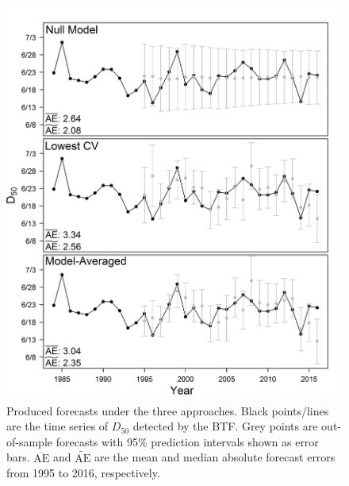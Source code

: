 \documentclass[12pt,]{book}
\theoremstyle{definition}
\theoremstyle{definition}
\theoremstyle{definition}
\theoremstyle{remark}
\begin{document}
\begin{figure}
  \centering
  \includegraphics{img/Ch2/forecasts.png}
  \caption{Produced forecasts under the three approaches. Black points/lines are the time series of $D_{50}$ detected by the BTF. Grey points are out-of-sample forecasts with 95$\%$ prediction intervals shown as error bars. $\overline{\text{AE}}$ and $\widetilde{\text{AE}}$ are the mean and median absolute forecast errors from 1995 to 2016, respectively.}
  \label{fig:forecasts}
\end{figure}

\pagebreak
\end{document}
